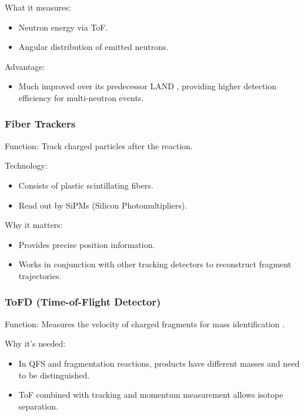 What it measures:

\begin{itemize}
	\item Neutron energy via ToF.
	\item Angular distribution of emitted neutrons.
\end{itemize}

Advantage:

\begin{itemize}
	\item Much improved over its predecessor LAND \cite{blaich_large_1992}, providing higher detection efficiency for multi-neutron events.
\end{itemize}


\subsubsection{Fiber Trackers}

Function: Track charged particles after the reaction.

Technology:

\begin{itemize}
	\item Consists of plastic scintillating fibers.
	\item Read out by SiPMs (Silicon Photomultipliers).
\end{itemize}

Why it matters:

\begin{itemize}
	\item Provides precise position information.
	\item Works in conjunction with other tracking detectors to reconstruct fragment trajectories.
\end{itemize}


\subsubsection{ToFD (Time-of-Flight Detector)}

Function: Measures the velocity of charged fragments for mass identification \cite{heil_new_2022}.

Why it’s needed:

\begin{itemize}
	\item In \gls{QFS} and fragmentation reactions, products have different masses and need to be distinguished.
	\item ToF combined with tracking and momentum measurement allows isotope separation.
\end{itemize}

